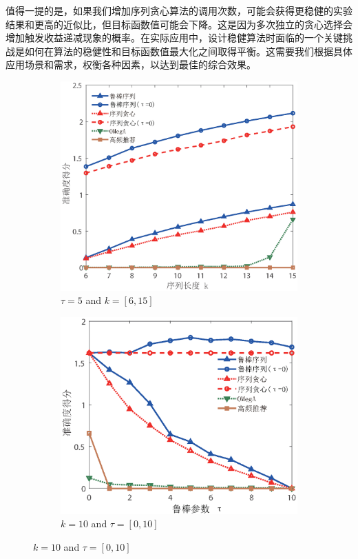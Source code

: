 值得一提的是，如果我们增加序列贪心算法的调用次数，可能会获得更稳健的实验结果和更高的近似比，但目标函数值可能会下降。这是因为多次独立的贪心选择会增加触发收益递减现象的概率。在实际应用中，设计稳健算法时面临的一个关键挑战是如何在算法的稳健性和目标函数值最大化之间取得平衡。这需要我们根据具体应用场景和需求，权衡各种因素，以达到最佳的综合效果。

\begin{figure}[H]
    \centering
    \begin{subfigure}{0.45\textwidth}
        \includegraphics[width=\linewidth]{figure/rosenets/wik/wik-acc}
        \caption{$\tau=5$ and $k=[6,15]$}
        \label{fig:wik-acc}
    \end{subfigure}
    \hfill
    \begin{subfigure}{0.45\textwidth}
        \includegraphics[width=\linewidth]{figure/rosenets/wik/wik-acc-t}
        \caption{$k=10$ and $\tau=[0,10]$}
        \label{fig:wik-acc-t}
    \end{subfigure}


\end{figure}

